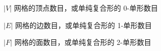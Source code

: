 
\begin{notation}

  \begin{notationlist}{2em}
    \item[$\displaystyle |V|$] 网格的顶点数目，或单纯复合形的 0-单形数目
    \item[$\displaystyle |E|$] 网格的边数目，或单纯复合形的 1-单形数目
    \item[$\displaystyle |F|$] 网格的面数目，或单纯复合形的 2-单形数目 
  \end{notationlist}

\end{notation}





